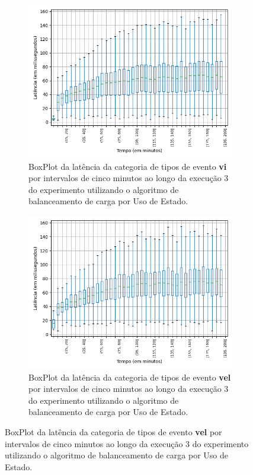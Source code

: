 \begin{figure}
\begin{subfigure}{.5\textwidth}
\centering
\includegraphics[width=\textwidth]{figuras/graphics/boxplot_8-dez-su_vi.png}
\caption{BoxPlot da latência da categoria de tipos de evento \textbf{vi} por intervalos de cinco minutos ao longo da execução 3 do experimento utilizando o algoritmo de balanceamento de carga por Uso de Estado.}
\label{fig:BoxPlot_vi_SU_8-dez-su}
\end{subfigure}%
\centering
\begin{subfigure}{.5\textwidth}
\centering
\includegraphics[width=\textwidth]{figuras/graphics/boxplot_8-dez-su_vel.png}
\caption{BoxPlot da latência da categoria de tipos de evento \textbf{vel} por intervalos de cinco minutos ao longo da execução 3 do experimento utilizando o algoritmo de balanceamento de carga por Uso de Estado.}
\label{fig:BoxPlot_vel_SU_8-dez-su}
\end{subfigure}%


\end{figure}
